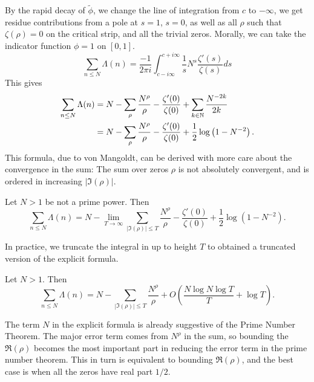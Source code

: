By the rapid decay of $\tilde\phi$, we change the line of integration from $c$ to $-\infty$, we get residue contributions from
a pole at $s=1$, $s=0$, as well as all $\rho$ such that $\zeta(\rho)=0$ on the critical strip,
and all the trivial zeros. 
Morally, we can take the indicator function $\phi=1$ on $[0,1]$. 
\begin{equation}\label{preexplicit}
    \sum_{n\leq N} \Lambda(n)=
    \frac{-1}{2\pi i}\int_{c-i\infty}^{c+i\infty}
    \frac{1}{s} N^s \frac{\zeta'(s)}{\zeta(s)} ds
\end{equation}
This gives \begin{equation}
    \begin{split}
        \sum_{n\leq N} \Lambda(n)&= N - \sum_{\rho} \frac{N^\rho}{\rho} -
        \frac{\zeta'(0)}{\zeta(0)} + \sum_{k\in\mathbb{N}}\frac{N^{-2k}}{2k} \\
        &= N - \sum_{\rho} \frac{N^\rho}{\rho} -
        \frac{\zeta'(0)}{\zeta(0)} + \frac{1}{2}\log\left(1-N^{-2}\right). 
    \end{split}
\end{equation}
This formula, due to von Mangoldt, can be derived with more care about the convergence in the sum:
The sum over zeros $\rho$ is not absolutely convergent, and is ordered in increasing $|\Im(\rho)|$.
\begin{theorem}
    Let $N>1$ be not a prime power. Then\begin{equation}
    \sum_{n\leq N} \Lambda(n) = N - \lim_{T\to \infty}\sum_{|\Im{(\rho)}|\leq T} \frac{N^\rho}{\rho} -
    \frac{\zeta'(0)}{\zeta(0)} + \frac{1}{2}\log\left(1-N^{-2}\right). 
    \end{equation}
\end{theorem}
In practice, we truncate the integral in \label{preexplicit} up to height $T$ to obtained a truncated version of the explicit formula.
\begin{theorem}
    Let $N>1$. Then\begin{equation}
        \sum_{n\leq N} \Lambda(n) = N - \sum_{|\Im{(\rho)}|\leq T} \frac{N^\rho}{\rho} + O(\frac{N\log N \log T}{T} + \log T). 
        \end{equation}
\end{theorem}
The term $N$ in the explicit formula is already suggestive of the Prime Number Theorem. 
The major error term comes from $N^\rho$ in the sum, so bounding the $\Re(\rho)$ becomes the most important part in reducing the error term in the prime number theorem. 
This in turn is equivalent to bounding $\Re({\rho})$, and the best case is when all the zeros have real part $1/2$.

